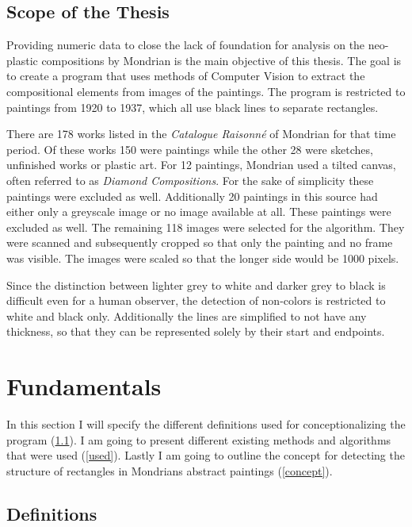 \documentclass[serif,article,noparskip]{agse-thesis}
\begin{document}
\subsection{Scope of the Thesis}

Providing numeric data to close the lack of foundation for analysis on the
neo-plastic compositions by Mondrian is the main objective of this thesis. The
goal is to create a program that uses methods of Computer Vision to extract the
compositional elements from images of the paintings. The program is restricted
to paintings from 1920 to 1937, which all use black lines to separate rectangles.

There are 178 works listed in the \textit{Catalogue Raisonn{\'e}}
\cite{joosten1998} of Mondrian for that time period. Of these works 150 were
paintings while the other 28 were sketches, unfinished works or plastic art. For
12 paintings, Mondrian used a tilted canvas, often referred to as
\textit{Diamond Compositions}. For the sake of simplicity these paintings were
excluded as well. Additionally 20 paintings in this source had either only a
greyscale image or no image available at all. These paintings were excluded as
well. The remaining 118 images were selected for the algorithm. They were
scanned and subsequently cropped so that only the painting and no frame was
visible. The images were scaled so that the longer side would be 1000 pixels.

Since the distinction between lighter grey to white and darker grey to black is
difficult even for a human observer, the detection of non-colors is restricted
to white and black only. Additionally the lines are simplified to not have any
thickness, so that they can be represented solely by their start and endpoints.

\section{Fundamentals} \label{fundamentals}

In this section I will specify the different definitions used for
conceptionalizing the program (\ref{definitions}). I am going to present
different existing methods and algorithms that were used (\ref{used}). Lastly I
am going to outline the concept for detecting the structure of rectangles in
Mondrians abstract paintings (\ref{concept}).

\subsection{Definitions} \label{definitions}
\end{document}
